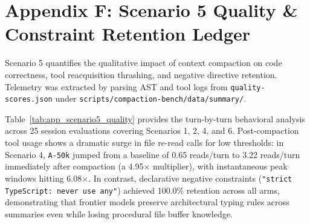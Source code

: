 \documentclass[10pt,twocolumn,a4paper]{article}
\begin{document}
\clearpage
\section*{Appendix F: Scenario 5 Quality \& Constraint Retention Ledger}

Scenario 5 quantifies the qualitative impact of context compaction on code correctness, tool reacquisition thrashing, and negative directive retention. Telemetry was extracted by parsing AST and tool logs from \nolinkurl{quality-scores.json} under \nolinkurl{scripts/compaction-bench/data/summary/}.

Table~\ref{tab:app_scenario5_quality} provides the turn-by-turn behavioral analysis across 25 session evaluations covering Scenarios 1, 2, 4, and 6. Post-compaction tool usage shows a dramatic surge in file re-read calls for low thresholds: in Scenario 4, \texttt{A-50k} jumped from a baseline of 0.65 reads/turn to 3.22 reads/turn immediately after compaction (a 4.95$\times$ multiplier), with instantaneous peak windows hitting 6.08$\times$. In contrast, declarative negative constraints (\texttt{"strict TypeScript: never use any"}) achieved 100.0\% retention across all arms, demonstrating that frontier models preserve architectural typing rules across summaries even while losing procedural file buffer knowledge.
\end{document}
